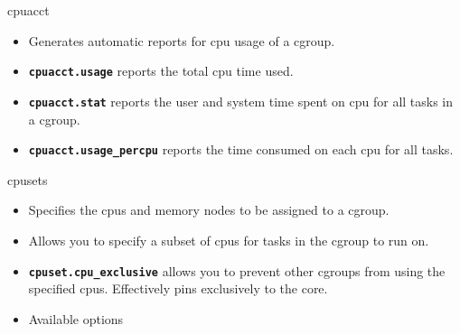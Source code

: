 \documentclass[pdf]{beamer}
\begin{document}
\begin{frame}{cpuacct}
\begin{itemize}
\item Generates automatic reports for cpu usage of a cgroup.
\item \textbf{\texttt{cpuacct.usage}} reports the total cpu time used. 
\item \textbf{\texttt{cpuacct.stat}} reports the user and system time spent on cpu for all tasks in a cgroup.
\item \textbf{\texttt{cpuacct.usage\_percpu}} reports the time consumed on each cpu for all tasks.
\end{itemize}
\end{frame}


\begin{frame}{cpusets}
\begin{itemize}
\item Specifies the cpus and memory nodes to be assigned to a cgroup.
\item Allows you to specify a subset of cpus for tasks in the cgroup to run on.
\item \textbf{\texttt{cpuset.cpu\_exclusive}} allows you to prevent other cgroups from using the specified cpus. Effectively pins exclusively to the core.
\item Available options
\end{itemize}
\end{frame}
\end{document}
